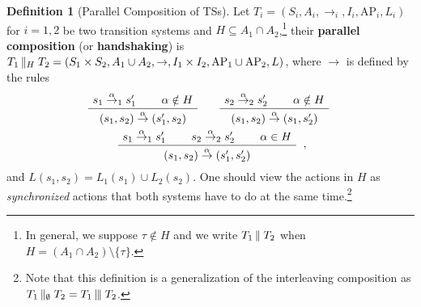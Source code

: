 \documentclass{tufte-handout} %
\theoremstyle{definition}
\newtheorem{defn}[thm]{Definition}
\theoremstyle{remark}
\newcommand{\0}{\textsf{0}}
\newcommand{\1}{\textsf{1}}
\newcommand{\AP}{\text{AP}}
\newcommand{\tmid}{\kern-0.20ex\mid\kern-0.20ex\mid\kern-0.20ex \mid}
\newcommand{\dmid}{\kern-0.20ex\mid\kern-0.20ex\mid}
\newcommand{\action}[1]{\stackrel{#1}{\rightarrow}}
\newenvironment{bprooftree}
{\leavevmode\hbox\bgroup}
{\DisplayProof\egroup}
\begin{document}
\begin{defn}[Parallel Composition of TSs]
	Let $T_i = (S_i, A_i, \rightarrow_i, I_i, \AP_i, L_i)$ for $i=1,2$ be two transition systems and $H \subseteq A_1\cap A_2$,\footnote{In general, we suppose $\tau \notin H$ and we write $T_1 \dmid T_2$ when $H = (A_1 \cap A_2)\setminus \{\tau\}$.} their \textbf{parallel composition} (or \textbf{handshaking}) is $T_1 \dmid_H T_2 = (S_1 \times S_2, A_1 \cup A_2, \rightarrow, I_1 \times I_2, \AP_1 \cup \AP_2, L)$, where $\rightarrow$ is defined by the rules
	\begin{gather*}
	\begin{bprooftree}
	\AxiomC{$s_1 \action{\alpha}_1 s_1'$}
	\AxiomC{$\alpha \notin H$}
	\RightLabel{}
	\BinaryInfC{$(s_1, s_2)\action{\alpha}(s_1', s_2)$}
	\end{bprooftree} \quad \begin{bprooftree}
	\AxiomC{$s_2 \action{\alpha}_2 s_2'$}
	\AxiomC{$\alpha \notin H$}
	\RightLabel{}
	\BinaryInfC{$(s_1, s_2)\action{\alpha}(s_1, s_2')$}
	\end{bprooftree}\\
	\begin{bprooftree}
	\AxiomC{$s_1 \action{\alpha}_1 s_1'$}
	\AxiomC{$s_2 \action{\alpha}_2 s_2'$}
	\AxiomC{$\alpha \in H$}
	\RightLabel{}
	\TrinaryInfC{$(s_1, s_2)\action{\alpha}(s_1', s_2')$}
	\end{bprooftree},
	\end{gather*}
	and $L(s_1, s_2) =  L_1(s_1) \cup L_2(s_2)$. One should view the actions in $H$ as \textit{synchronized} actions that both systems have to do at the same time.\footnote{Note that this definition is a generalization of the interleaving composition as $T_1 \dmid_{\emptyset} T_2 = T_1 \tmid T_2$.}
\end{defn}
\end{document}
